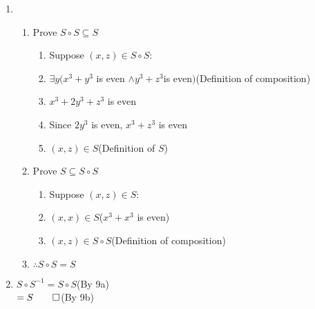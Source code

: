 \documentclass[12pt, a4paper]{article}
\begin{document}
\begin{enumerate}[Q\arabic*.]
\begin{enumerate}[(\alph*)]
      \item \begin{enumerate}[label=\arabic*., parsep=1em]
        \item Prove $S\circ S \subseteq S$
          \begin{enumerate}[label=1.\arabic*., parsep=1em]
            \item Suppose $(x, z) \in S \circ S$:
            \item $\exists y (x^3 + y^3$ is even $\land y^3 + z^3$is even$)$\hfill(Definition of composition)
        \item $x^3 + 2y^3 + z^3$ is even
            \item Since $2y^3$ is even, $x^3 + z^3$ is even
            \item $(x, z) \in S$\hfill(Definition of $S$)
          \end{enumerate}
        \item Prove $S \subseteq S\circ S$
          \begin{enumerate}[label=2.\arabic*., parsep=1em]
            \item Suppose $(x, z) \in S$:
            \item $(x, x) \in S$\hfill($x^3 + x^3$ is even)
            \item $(x, z) \in S\circ S$\hfill(Definition of composition)
          \end{enumerate}
        \item $\therefore S\circ S = S$
      \end{enumerate}

      \item $S\circ S^{-1} = S\circ S$\hfill(By 9a)\\
        $= S\qed$\hfill(By 9b)
    \end{enumerate}


\end{enumerate}
\end{document}
